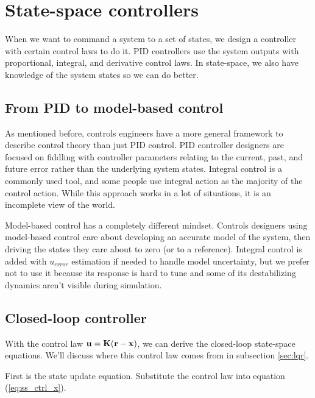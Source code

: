 
\chapter{State-space controllers}

When we want to command a \gls{system} to a set of states, we design a
controller with certain \glspl{control law} to do it. PID controllers use the
system outputs with proportional, integral, and derivative \glspl{control law}.
In state-space, we also have knowledge of the system states so we can do better.

\section{From PID to model-based control}

As mentioned before, controls engineers have a more general framework to
describe control theory than just PID control. PID controller designers are
focused on fiddling with controller parameters relating to the current, past,
and future error rather than the underlying system states. Integral control is a
commonly used tool, and some people use integral action as the majority of the
control action. While this approach works in a lot of situations, it is an
incomplete view of the world.

Model-based control has a completely different mindset. Controls designers using
model-based control care about developing an accurate model of the system, then
driving the states they care about to zero (or to a \gls{reference}). Integral
control is added with $u_{error}$ estimation if needed to handle model
uncertainty, but we prefer not to use it because its response is hard to tune
and some of its destabilizing dynamics aren't visible during simulation.

\section{Closed-loop controller}

With the \gls{control law} $\mathbf{u} = \mathbf{K}(\mathbf{r} - \mathbf{x})$, we can derive
the closed-loop state-space equations. We'll discuss where this control law
comes from in subsection \ref{sec:lqr}.

First is the state update equation. Substitute the control law into equation
(\ref{eq:ss_ctrl_x}).

